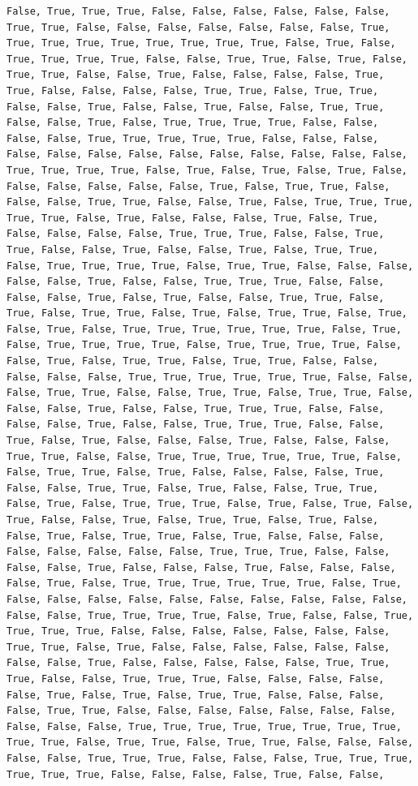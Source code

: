 \documentclass[
  letterpaper,
  DIV=11,
  numbers=noendperiod]{scrartcl}
\begin{document}
\begin{verbatim}
False, True, True, True, False, False, False, False, False, False, True, True, False, False, False, False, False, False, False, True, True, True, True, True, True, True, True, True, False, True, False, True, True, True, True, False, False, True, True, False, True, False, True, True, False, False, True, False, False, False, False, True, True, False, False, False, False, True, True, False, True, True, False, False, True, False, False, True, False, False, True, True, False, False, True, False, True, True, True, True, False, False, False, False, True, True, True, True, True, False, False, False, False, False, False, False, False, False, False, False, False, False, True, True, True, True, False, True, False, True, False, True, False, False, False, False, False, False, True, False, True, True, False, False, False, True, True, False, False, True, False, True, True, True, True, True, False, True, False, False, False, True, False, True, False, False, False, False, True, True, True, False, False, True, True, False, False, True, False, False, True, False, True, True, False, True, True, True, True, False, True, True, False, False, False, False, False, True, False, False, True, True, True, False, False, False, False, True, False, True, False, False, True, True, False, True, False, True, True, False, True, False, True, True, False, True, False, True, False, True, True, True, True, True, True, False, True, False, True, True, True, True, False, True, True, True, True, False, False, True, False, True, True, False, True, True, False, False, False, False, False, True, True, True, True, True, True, False, False, False, True, True, False, False, True, True, False, True, True, False, False, False, True, False, False, True, True, True, False, False, False, False, True, False, False, True, True, True, False, False, True, False, True, False, False, False, True, False, False, False, True, True, False, False, True, True, True, True, True, True, False, False, True, True, False, True, False, False, False, False, True, False, False, True, True, False, True, False, False, True, True, False, True, False, True, True, True, False, True, False, True, False, True, False, False, True, False, True, True, False, True, False, False, True, False, True, True, False, True, False, False, False, False, False, False, False, False, True, True, True, False, False, False, False, True, False, False, False, True, False, False, False, False, True, False, True, True, True, True, True, True, False, True, False, False, False, False, False, False, False, False, False, False, False, False, True, True, True, True, False, True, False, False, True, True, True, True, False, False, False, False, False, False, False, True, True, False, True, False, False, False, False, False, False, False, False, True, False, False, False, False, False, True, True, True, False, False, True, True, True, False, False, False, False, False, True, False, True, False, True, True, False, False, False, False, True, True, False, False, False, False, False, False, False, False, False, False, True, True, True, True, True, True, True, True, True, True, False, True, True, False, True, True, False, False, False, False, False, True, True, True, False, False, False, True, True, True, True, True, True, False, False, False, False, True, False, False, 
\end{verbatim}
\end{document}
